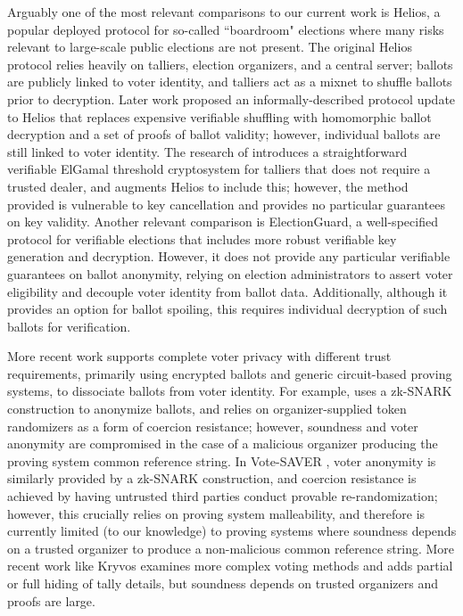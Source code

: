 \documentclass{llncs}
\begin{document}
Arguably one of the most relevant comparisons to our current work is Helios, a popular deployed protocol for so-called ``boardroom" elections where many risks relevant to large-scale public elections are not present.
The original Helios protocol \cite{helios} relies heavily on talliers, election organizers, and a central server; ballots are publicly linked to voter identity, and talliers act as a mixnet to shuffle ballots prior to decryption.
Later work proposed an informally-described protocol update to Helios \cite{helios2} that replaces expensive verifiable shuffling with homomorphic ballot decryption and a set of proofs of ballot validity; however, individual ballots are still linked to voter identity.
The research of \cite{cortier} introduces a straightforward verifiable ElGamal threshold cryptosystem for talliers that does not require a trusted dealer, and augments Helios to include this; however, the method provided is vulnerable to key cancellation and provides no particular guarantees on key validity.
Another relevant comparison is ElectionGuard, a well-specified protocol for verifiable elections \cite{electionguard} that includes more robust verifiable key generation and decryption.
However, it does not provide any particular verifiable guarantees on ballot anonymity, relying on election administrators to assert voter eligibility and decouple voter identity from ballot data.
Additionally, although it provides an option for ballot spoiling, this requires individual decryption of such ballots for verification.

More recent work supports complete voter privacy with different trust requirements, primarily using encrypted ballots and generic circuit-based proving systems, to dissociate ballots from voter identity.
For example, \cite{dimitriou} uses a zk-SNARK construction to anonymize ballots, and relies on organizer-supplied token randomizers as a form of coercion resistance; however, soundness and voter anonymity are compromised in the case of a malicious organizer producing the proving system common reference string.
In Vote-SAVER \cite{saver}, voter anonymity is similarly provided by a zk-SNARK construction, and coercion resistance is achieved by having untrusted third parties conduct provable re-randomization; however, this crucially relies on proving system malleability, and therefore is currently limited (to our knowledge) to proving systems where soundness depends on a trusted organizer to produce a non-malicious common reference string.
More recent work like Kryvos \cite{kryvos} examines more complex voting methods and adds partial or full hiding of tally details, but soundness depends on trusted organizers and proofs are large.
\end{document}

